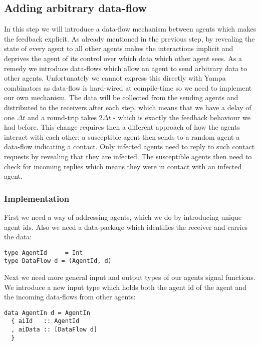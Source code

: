 \subsection{Adding arbitrary data-flow}
\label{sec:step3_dataflow}
In this step we will introduce a data-flow mechanism between agents which makes the feedback explicit. As already mentioned in the previous step, by revealing the state of every agent to all other agents makes the interactions implicit and deprives the agent of its control over which data which other agent sees. As a remedy we introduce data-flows which allow an agent to send arbitrary data to other agents. Unfortunately we cannot express this directly with Yampa combinators as data-flow is hard-wired at compile-time so we need to implement our own mechanism. The data will be collected from the sending agents and distributed to the receivers after each step, which means that we have a delay of one $\Delta t$ and a round-trip takes $2 \Delta t$ - which is exactly the feedback behaviour we had before.
This change requires then a different approach of how the agents interact with each other: a susceptible agent then sends to a random agent a data-flow indicating a contact. Only infected agents need to reply to such contact requests by revealing that they are infected. The susceptible agents then need to check for incoming replies which means they were in contact with an infected agent.


\subsubsection{Implementation}
First we need a way of addressing agents, which we do by introducing unique agent ids. Also we need a data-package which identifies the receiver and carries the data:
\begin{verbatim}
type AgentId     = Int
type DataFlow d = (AgentId, d)
\end{verbatim}

Next we need more general input and output types of our agents signal functions. We introduce a new input type which holds both the agent id of the agent and the incoming data-flows from other agents:

\begin{verbatim}
data AgentIn d = AgentIn
  { aiId   :: AgentId
  , aiData :: [DataFlow d]
  } 
\end{verbatim}


